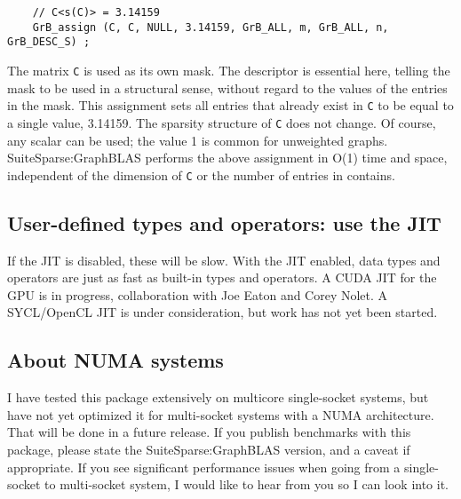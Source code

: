 \documentclass[12pt]{article}
\begin{document}
    {\footnotesize
    \begin{verbatim}
    // C<s(C)> = 3.14159
    GrB_assign (C, C, NULL, 3.14159, GrB_ALL, m, GrB_ALL, n, GrB_DESC_S) ; \end{verbatim}}

The matrix \verb'C' is used as its own mask.  The descriptor is essential here,
telling the mask to be used in a structural sense, without regard to the values
of the entries in the mask.  This assignment sets all entries that already
exist in \verb'C' to be equal to a single value, 3.14159. The sparsity
structure of \verb'C' does not change.  Of course, any scalar can be used; the
value 1 is common for unweighted graphs.  SuiteSparse:GraphBLAS performs the
above assignment in O(1) time and space, independent of the dimension of
\verb'C' or the number of entries in contains.

\subsection{User-defined types and operators: use the JIT}

If the JIT is disabled, these will be slow.  With the JIT enabled, data types
and operators are just as fast as built-in types and operators.  A CUDA JIT for
the GPU is in progress, collaboration with Joe Eaton and Corey Nolet.
A SYCL/OpenCL JIT is under consideration, but work has not yet been started.

\subsection{About NUMA systems}

I have tested this package extensively on multicore single-socket systems, but
have not yet optimized it for multi-socket systems with a NUMA architecture.
That will be done in a future release.  If you publish benchmarks
with this package, please state the SuiteSparse:GraphBLAS version, and a caveat
if appropriate.  If you see significant performance issues when going from a
single-socket to multi-socket system, I would like to hear from you so I can
look into it.

\newpage
\end{document}
